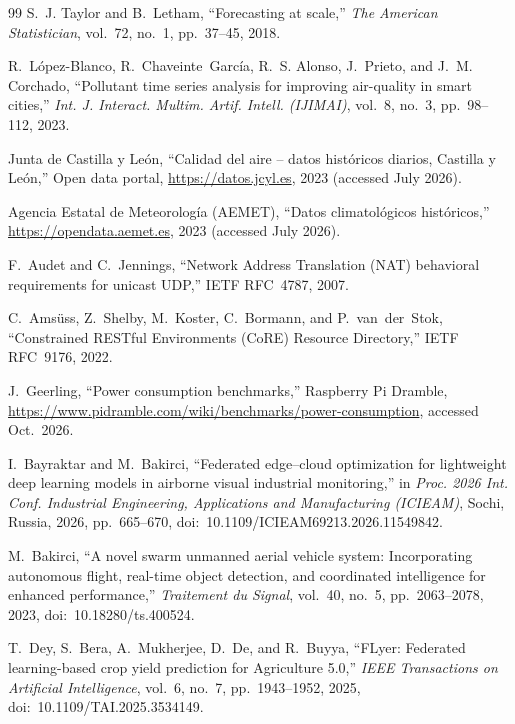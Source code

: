 \documentclass[a4paper,fleqn]{cas-dc}
\begin{document}
\begin{thebibliography}{99}
S.~J. Taylor and B.~Letham,
``Forecasting at scale,''
\emph{The American Statistician}, vol.~72, no.~1, pp.~37--45, 2018.

R.~L\'opez-Blanco, R.~Chaveinte~Garc\'ia, R.~S. Alonso, J.~Prieto, and J.~M. Corchado,
``Pollutant time series analysis for improving air-quality in smart cities,''
\emph{Int. J. Interact. Multim. Artif. Intell. (IJIMAI)}, vol.~8, no.~3, pp.~98--112, 2023.

Junta de Castilla y Le\'on,
``Calidad del aire -- datos hist\'oricos diarios, Castilla y Le\'on,''
Open data portal, \url{https://datos.jcyl.es}, 2023 (accessed July 2026).

Agencia Estatal de Meteorolog\'ia (AEMET),
``Datos climatol\'ogicos hist\'oricos,''
\url{https://opendata.aemet.es}, 2023 (accessed July 2026).


F.~Audet and C.~Jennings,
``Network Address Translation (NAT) behavioral requirements for unicast UDP,''
IETF RFC~4787, 2007.

C.~Ams\"{u}ss, Z.~Shelby, M.~Koster, C.~Bormann, and P.~van~der~Stok,
``Constrained RESTful Environments (CoRE) Resource Directory,''
IETF RFC~9176, 2022.

J.~Geerling,
``Power consumption benchmarks,''
Raspberry Pi Dramble, \url{https://www.pidramble.com/wiki/benchmarks/power-consumption}, accessed Oct.~2026.


I.~Bayraktar and M.~Bakirci,
``Federated edge--cloud optimization for lightweight deep learning models in airborne visual industrial monitoring,''
in \emph{Proc. 2026 Int. Conf. Industrial Engineering, Applications and Manufacturing (ICIEAM)}, Sochi, Russia, 2026, pp.~665--670, doi:~10.1109/ICIEAM69213.2026.11549842.

M.~Bakirci,
``A novel swarm unmanned aerial vehicle system: Incorporating autonomous flight, real-time object detection, and coordinated intelligence for enhanced performance,''
\emph{Traitement du Signal}, vol.~40, no.~5, pp.~2063--2078, 2023, doi:~10.18280/ts.400524.

T.~Dey, S.~Bera, A.~Mukherjee, D.~De, and R.~Buyya,
``FLyer: Federated learning-based crop yield prediction for Agriculture 5.0,''
\emph{IEEE Transactions on Artificial Intelligence}, vol.~6, no.~7, pp.~1943--1952, 2025, doi:~10.1109/TAI.2025.3534149.


\end{thebibliography}
\end{document}
